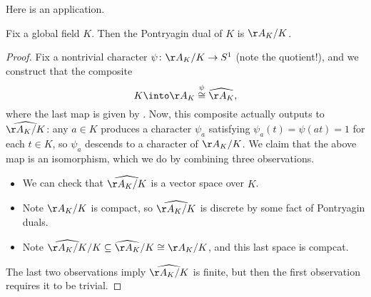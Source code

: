 \documentclass{article}
\begin{document}
Here is an application.
\begin{corollary} \label{cor:dual-global}
	Fix a global field $K$. Then the Pontryagin dual of $K$ is $\AA_K/K$.
\end{corollary}
\begin{proof}
	Fix a nontrivial character $\psi\colon\AA_K/K\to S^1$ (note the quotient!), and we construct that the composite
	\[K\into\AA_K\stackrel\psi\cong\widehat{\AA_K},\]
	where the last map is given by . Now, this composite actually outputs to $\widehat{\AA_K/K}$: any $a\in K$ produces a character $\psi_a$ satisfying $\psi_a(t)=\psi(at)=1$ for each $t\in K$, so $\psi_a$ descends to a character of $\AA_K/K$. We claim that the above map is an isomorphism, which we do by combining three observations.
	\begin{itemize}
		\item We can check that $\widehat{\AA_K/K}$ is a vector space over $K$.
		\item Note $\AA_K/K$ is compact, so $\widehat{\AA_K/K}$ is discrete by some fact of Pontryagin duals.
		\item Note $\widehat{\AA_K/K}/K\subseteq\widehat{\AA_K}/K\cong\AA_K/K$, and this last space is compcat.
	\end{itemize}
	The last two observations imply $\widehat{\AA_K/K}$ is finite, but then the first observation requires it to be trivial.
\end{proof}
\end{document}
